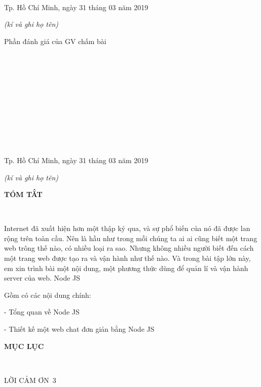 \documentclass{report}
\begin{document}
\vspace{0.8cm}
\setlength{\parindent}{1cm}
\ \xfill{1pt} \

\bigskip
\ \xfill{1pt} \

\bigskip
\ \xfill{1pt} \

\bigskip
\ \xfill{1pt} \

\bigskip
\ \xfill{1pt} \

\bigskip
\ \xfill{1pt} \

\changefontsizes{12pt}
\setlength{\parindent}{8cm}
Tp. Hồ Chí Minh, ngày 31 tháng 03 năm 2019

\setlength{\parindent}{11cm}
\textit{(kí và ghi họ tên)}

\changefontsizes{13pt}
\vspace{2.5cm}
\setlength{\parindent}{2.2cm}
Phần đánh giá của GV chấm bài

\vspace{0.8cm}
\setlength{\parindent}{1cm}
\ \xfill{1pt} \

\bigskip
\ \xfill{1pt} \

\bigskip
\ \xfill{1pt} \

\bigskip
\ \xfill{1pt} \

\bigskip
\ \xfill{1pt} \

\bigskip
\ \xfill{1pt} \

\changefontsizes{12pt}
\setlength{\parindent}{8cm}
Tp. Hồ Chí Minh, ngày 31 tháng 03 năm 2019

\setlength{\parindent}{11cm}
\textit{(kí và ghi họ tên)}

\newpage
\changefontsizes{16pt}
\centerline{\textbf{TÓM TẮT}}\

\changefontsizes{13pt}
\setlength{\parindent}{2cm}
Internet đã xuất hiện hơn một thập kỷ qua, và sự phổ biến của nó đã được lan rộng trên toàn cầu. Nên là hầu như trong mỗi chúng ta ai ai cũng biết một trang web trông thế nào, có nhiều loại ra sao. Nhưng không nhiều người biết đến cách một trang web được tạo ra và vận hành như thế nào. Và trong bài tập lớn này, em xin trình bài một nội dung, một phương thức dùng để quản lí và vận hành server của web. Node JS

Gồm có các nội dung chính:

\setlength{\parindent}{3cm}
- Tổng quan về Node JS

- Thiết kế một web chat đơn giản bằng Node JS

\newpage
\changefontsizes{16pt}
\centerline{\textbf{MỤC LỤC}}\

\vspace{1.2cm}
\changefontsizes{14pt}
\setlength{\parindent}{0cm}
LỜI CẢM ƠN\dotfill\ 3
\end{document}
